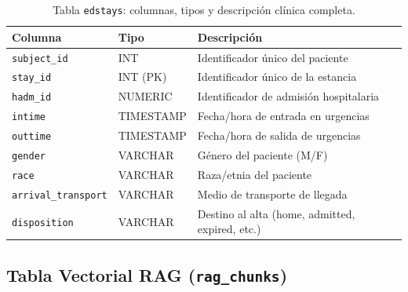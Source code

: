 \begin{table}[H]
\centering
\caption{Tabla \texttt{edstays}: columnas, tipos y descripción clínica completa.}
\label{tab:appendix_edstays}
\footnotesize
\begin{tabularx}{\columnwidth}{llX}
\toprule
\textbf{Columna} & \textbf{Tipo} & \textbf{Descripción} \\
\midrule
\texttt{subject\_id} & INT & Identificador único del paciente \\
\texttt{stay\_id} & INT (\ac{PK}) & Identificador único de la estancia \\
\texttt{hadm\_id} & NUMERIC & Identificador de admisión hospitalaria \\
\texttt{intime} & TIMESTAMP & Fecha/hora de entrada en urgencias \\
\texttt{outtime} & TIMESTAMP & Fecha/hora de salida de urgencias \\
\texttt{gender} & VARCHAR & Género del paciente (M/F) \\
\texttt{race} & VARCHAR & Raza/etnia del paciente \\
\texttt{arrival\_transport} & VARCHAR & Medio de transporte de llegada \\
\texttt{disposition} & VARCHAR & Destino al alta (home, admitted, expired, etc.) \\
\bottomrule
\end{tabularx}
\end{table}

\subsection{Tabla Vectorial \acs{RAG} (\texttt{rag\_chunks})}

